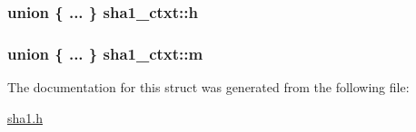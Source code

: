 \hypertarget{structsha1__ctxt_a478ab16257190d0cfd8bbede1eeeda7c}{
\subsubsection[{h}]{\setlength{\rightskip}{0pt plus 5cm}union \{ ... \} 			 sha1\-\_\-ctxt\-::h}}\label{structsha1__ctxt_a478ab16257190d0cfd8bbede1eeeda7c}
\hypertarget{structsha1__ctxt_a93549e237a32b4138b686c258a24e931}{
\subsubsection[{m}]{\setlength{\rightskip}{0pt plus 5cm}union \{ ... \} 			 sha1\-\_\-ctxt\-::m}}\label{structsha1__ctxt_a93549e237a32b4138b686c258a24e931}


The documentation for this struct was generated from the following file\-:\begin{DoxyCompactItemize}
\item 
\hyperlink{sha1_8h}{sha1.\-h}\end{DoxyCompactItemize}
